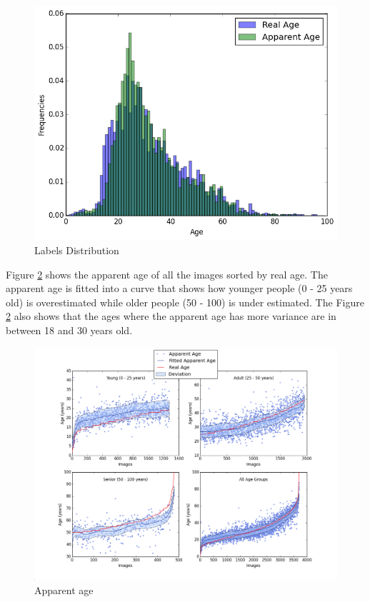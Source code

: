 \begin{figure}[h!]
	\centering
	\includegraphics[width=\textwidth]{figures/Label_Distribution}
	\caption{Labels Distribution}
	\label{fig:distr}
\end{figure}

Figure \ref{fig:apparent_real} shows the apparent age of all the images sorted by real age. The apparent age is fitted into a curve that shows how younger people (0 - 25 years old) is overestimated while older people (50 - 100) is under estimated. The Figure \ref{fig:apparent_real} also shows that the ages where the apparent age has more variance are in between 18 and 30 years old.

\begin{figure}[h!]
	\centering
	\includegraphics[width=\textwidth]{figures/Labels_across_img}
	\caption{Apparent age }
	\label{fig:apparent_real}
\end{figure}

